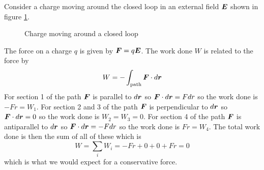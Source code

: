 \documentclass{article}
\begin{document}
    Consider a charge moving around the closed loop in an external field \(\bm{E}\) shown in figure \ref{fig:charge around a loop}.
    \begin{figure}[ht]
        \centering
        \caption{Charge moving around a closed loop}
        \label{fig:charge around a loop}
    \end{figure}
    The force on a charge \(q\) is given by \(\bm{F} = q\bm{E}\).
    The work done \(W\) is related to the force by
    \[W = -\int_{\text{path}} \bm{F}\cdot d\bm{r}\]
    For section 1 of the path \(\bm{F}\) is parallel to \(d\bm{r}\) so \(\bm{F}\cdot d\bm{r} = Fdr\) so the work done is  \(-Fr = W_1\).
    For section 2 and 3 of the path \(\bm{F}\) is perpendicular to \(d\bm{r}\) so \(\bm{F}\cdot d\bm{r} = 0\) so the work done is \(W_2 = W_3 = 0\).
    For section 4 of the path \(\bm{F}\) is antiparallel to \(d\bm{r}\) so \(\bm{F}\cdot d\bm{r} = -Fdr\) so the work done is \(Fr = W_4\).
    The total work done is then the sum of all of these which is
    \[W = \sum_i W_i = -Fr + 0 + 0 + Fr = 0\]
    which is what we would expect for a conservative force.
    
\end{document}
